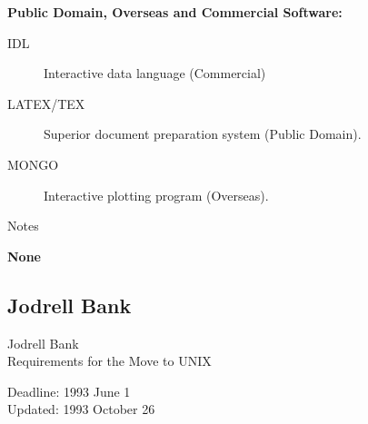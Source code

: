 \vspace{5mm}
\begin{center}
{\bf Public Domain, Overseas and Commercial Software:}
\end{center}

\begin{description}
\item[IDL] Interactive data language (Commercial)
\item[LATEX/TEX] Superior document preparation system (Public Domain).
\item[MONGO] Interactive plotting program (Overseas).
\end{description}


\vspace{5mm}
\begin{center}
{\large\sc Notes}
\end{center}

{\bf None}


\newpage
\subsection{Jodrell Bank}

\renewcommand{\starsitename}{Jodrell Bank}
\renewcommand{\starnodename}{JBVAD}

\renewcommand{\starunixdate}{1993 June 1}
\renewcommand{\starupdate}{1993 October 26}

\renewcommand{\starsitetelephone}{0477 71321 Ext. 293}
\renewcommand{\starsitefax}{0477 71618}

\begin{center}
{\Large\sc \starsitename \\ [2ex]
           Requirements for the Move to UNIX}

\vspace{3mm}
{\large\sc Deadline: \starunixdate \\ [1ex]
           Updated: \starupdate}
\end{center}

\vspace{5mm}

